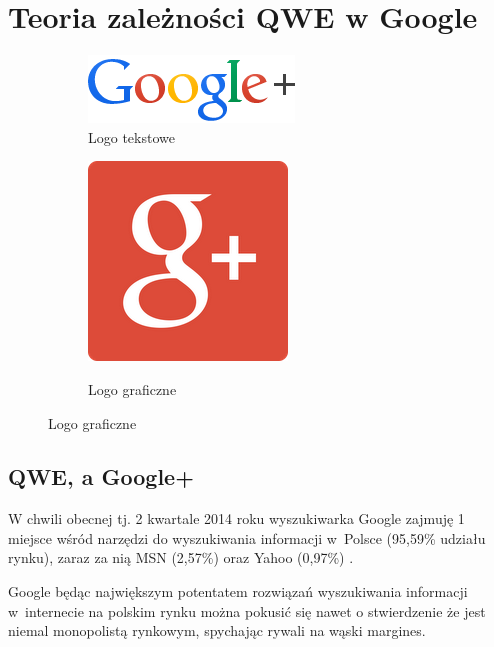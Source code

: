 \section{Teoria zależności QWE w Google}
\label{sec:teoria-zaleznosci-qwe-w-goole}

\begin{figure}[!h]
\centering
\begin{subfigure}{.5\textwidth}
  \centering
  \includegraphics[width=.4\linewidth]{images/googleplus_color.png}
  \caption{Logo tekstowe}
  \label{fig:google-logo-tekstowe}
\end{subfigure}%
\begin{subfigure}{.5\textwidth}
  \centering
  \scalebox{0.7}
  {
      \includegraphics[width=.4\linewidth]{images/google-plus-logo.png}
  }  
  \caption{Logo graficzne}
  \label{fig:google-logo-graficzne}
\end{subfigure}
\label{fig:logo-google}
\end{figure}

\lipsum[12-14]



\subsection{QWE, a Google+}
W chwili obecnej tj. 2 kwartale 2014 roku wyszukiwarka Google zajmuję 1 miejsce wśród narzędzi do wyszukiwania informacji w~Polsce (95,59\% udziału rynku), zaraz za nią MSN (2,57\%) oraz Yahoo (0,97\%) \parencite{url:gemius-ranking-silnikow-wyszukiwarek}.

Google będąc największym potentatem rozwiązań wyszukiwania informacji w~internecie na polskim rynku można pokusić się nawet o stwierdzenie że jest niemal monopolistą rynkowym, spychając rywali na wąski margines.

